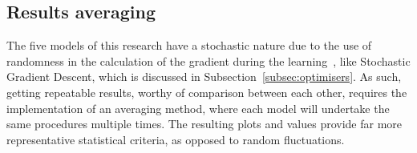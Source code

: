 \subsection{Results averaging} \label{subsec:avg}
%
The five models of this research have a stochastic nature due to the use of randomness in the calculation of the gradient during the learning~\cite{alma991010036879604001}, like Stochastic Gradient Descent, which is discussed in Subsection~\ref{subsec:optimisers}.
As such, getting repeatable results, worthy of comparison between each other, requires the implementation of an averaging method, where each model will undertake the same procedures multiple times.
The resulting plots and values provide far more representative statistical criteria, as opposed to random fluctuations.

